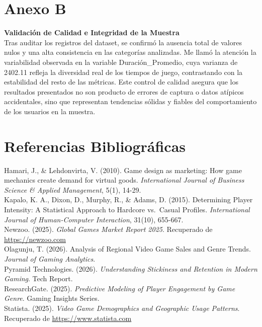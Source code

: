 \documentclass[oneside,11pt]{Latex/Classes/PhDthesisPSnPDF}
\begin{document}
\chapter{Anexo B}

\textbf{Validación de Calidad e Integridad de la Muestra}\\

Tras auditar los registros del dataset, se confirmó la ausencia total de
valores nulos y una alta consistencia en las categorías analizadas. Me
llamó la atención la variabilidad observada en la variable
Duración\_Promedio, cuya varianza de 2402.11 refleja la diversidad real
de los tiempos de juego, contrastando con la estabilidad del resto de
las métricas. Este control de calidad asegura que los resultados
presentados no son producto de errores de captura o datos atípicos
accidentales, sino que representan tendencias sólidas y fiables del
comportamiento de los usuarios en la muestra.

\chapter{Referencias Bibliográficas}

Hamari, J., \& Lehdonvirta, V. (2010). Game design as marketing: How
game mechanics create demand for virtual goods. \emph{International
Journal of Business Science \& Applied Management}, 5(1), 14-29.\\

Kapalo, K. A., Dixon, D., Murphy, R., \& Adams, D. (2015). Determining
Player Intensity: A Statistical Approach to Hardcore vs.~Casual
Profiles. \emph{International Journal of Human-Computer Interaction},
31(10), 655-667.\\

Newzoo. (2025). \emph{Global Games Market Report 2025}. Recuperado de
\url{https://newzoo.com}\\

Olagunju, T. (2026). Analysis of Regional Video Game Sales and Genre
Trends. \emph{Journal of Gaming Analytics}.\\

Pyramid Technologies. (2026). \emph{Understanding Stickiness and
Retention in Modern Gaming}. Tech Report.\\

ResearchGate. (2025). \emph{Predictive Modeling of Player Engagement by
Game Genre}. Gaming Insights Series.\\

Statista. (2025). \emph{Video Game Demographics and Geographic Usage
Patterns}. Recuperado de \url{https://www.statista.com}\\
\end{document}
